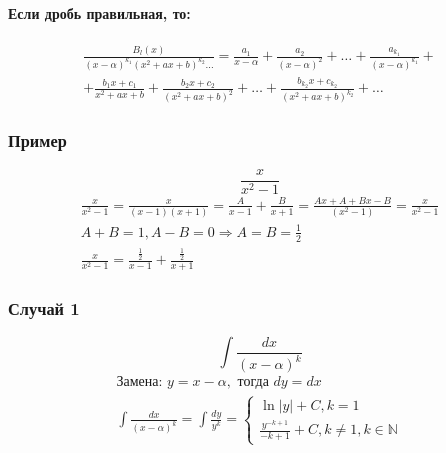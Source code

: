 \documentclass{article}
\begin{document}
\paragraph{Если дробь правильная, то:}
\begin{gather*}
    \frac{B_l(x)}{(x - \alpha)^{k_1} (x^2 + ax + b)^{k_2} \dots} =
    \frac{a_1}{x - \alpha} + \frac{a_2}{(x - \alpha)^2} + \dots + \frac{a_{k_1}}{(x - \alpha)^{k_1}} + \\
    + \frac{b_1x + c_1}{x^2 + ax + b} + \frac{b_2x + c_2}{(x^2 + ax + b)^2} + \dots + \frac{b_{k_2}x + c_{k_2}}{(x^2 + ax + b)^{k_2}} + \dots
\end{gather*}

\subsubsection{Пример}
\[
    \frac{x}{x^2 - 1}
\]
\begin{gather*}
    \frac{x}{x^2 - 1} = \frac{x}{(x - 1)(x + 1)} = \frac{A}{x - 1} + \frac{B}{x + 1} = \frac{Ax + A + Bx - B}{(x^2 - 1)} = \frac{x}{x^2 - 1} \\
    A + B = 1, A - B = 0 \Rightarrow A = B = \frac{1}{2} \\
    \frac{x}{x^2 - 1} = \frac{\frac{1}{2}}{x - 1} + \frac{\frac{1}{2}}{x + 1}
\end{gather*}

\subsubsection{Случай 1}
\[
    \int \frac{dx}{(x - \alpha)^k}
\]
\begin{gather*}
    \text{Замена: } y = x - \alpha, \text{ тогда } dy = dx \\
    \int \frac{dx}{(x - \alpha)^k} = \int \frac{dy}{y^k} = \begin{cases}
        \ln |y| + C, k = 1 \\
        \frac{y^{-k + 1}}{-k + 1} + C, k \neq 1, k \in \mathbb{N}
    \end{cases}
\end{gather*}
\end{document}
